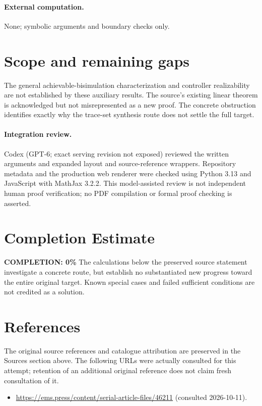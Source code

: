 \documentclass[11pt]{article}
\begin{document}
\paragraph{External computation.} None; symbolic arguments and boundary checks only.
\section{Scope and remaining gaps}
The general achievable-bisimulation characterization and controller realizability are not established by these auxiliary results. The source's existing linear theorem is acknowledged but not misrepresented as a new proof. The concrete obstruction identifies exactly why the trace-set synthesis route does not settle the full target.
\paragraph{Integration review.} Codex (GPT-6; exact serving revision not exposed) reviewed the written arguments and expanded layout and source-reference wrappers. Repository metadata and the production web renderer were checked using Python 3.13 and JavaScript with MathJax 3.2.2. This model-assisted review is not independent human proof verification; no PDF compilation or formal proof checking is asserted.

\section{Completion Estimate}
\noindent\textbf{COMPLETION: 0\%}
The calculations below the preserved source statement investigate a concrete route,
but establish no substantiated new progress toward the entire original target.
Known special cases and failed sufficient conditions are not credited as a solution.
\section{References}
The original source references and catalogue attribution are preserved in the
Sources section above. The following URLs were actually consulted for this attempt;
retention of an additional original reference does not claim fresh consultation of it.
\begin{itemize}
\item \url{https://ems.press/content/serial-article-files/46211} (consulted 2026-10-11). 
\end{itemize}
\end{document}
